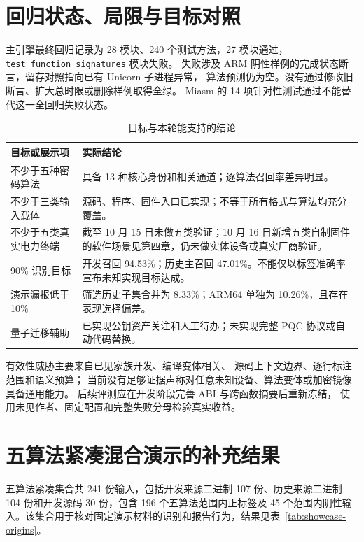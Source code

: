 \section{回归状态、局限与目标对照}
主引擎最终回归记录为 28 模块、240 个测试方法，27 模块通过，
\nolinkurl{test_function_signatures} 模块失败。
失败涉及 ARM 阴性样例的完成状态断言，留存对照指向已有 Unicorn 子进程异常，
算法预测仍为空。没有通过修改旧断言、扩大总时限或删除样例取得全绿。
Miasm 的 14 项针对性测试通过不能替代这一全回归失败状态。

\begin{table}[htbp]\centering\small
\caption{目标与本轮能支持的结论}\label{tab:goal-review}
\begin{tabularx}{\linewidth}{p{3.1cm}X}\toprule
目标或展示项 & 实际结论\\\midrule
不少于五种密码算法 & 具备 13 种核心身份和相关通道；逐算法召回率差异明显。\\
不少于三类输入载体 & 源码、程序、固件入口已实现；不等于所有格式与算法均充分覆盖。\\
不少于五类真实电力终端 & 截至 10 月 15 日未做五类验证；10 月 16 日新增五类自制固件的软件场景见第四章，仍未做实体设备或真实厂商验证。\\
90\% 识别目标 & 开发召回 94.53\%；历史主召回 47.01\%。不能仅以标签准确率宣布未知实现目标达成。\\
演示漏报低于 10\% & 筛选历史子集合并为 8.33\%；ARM64 单独为 10.26\%，且存在表现选择偏差。\\
量子迁移辅助 & 已实现公钥资产关注和人工待办；未实现完整 PQC 协议或自动代码替换。\\\bottomrule
\end{tabularx}\end{table}

有效性威胁主要来自已见家族开发、编译变体相关、
源码上下文边界、逐行标注范围和语义预算；
当前没有足够证据声称对任意未知设备、算法变体或加密镜像具备通用能力。
后续评测应在开发阶段完善 ABI 与跨函数摘要后重新冻结，
使用未见作者、固定配置和完整失败分母检验真实收益。

\section{五算法紧凑混合演示的补充结果}


五算法紧凑集合共 241 份输入，包括开发来源二进制 107 份、历史来源二进制 104 份和开发源码 30 份，包含 196 个五算法范围内正标签及 45 个范围内阴性输入。该集合用于核对固定演示材料的识别和报告行为，结果见表~\ref{tab:showcase-origins}。

